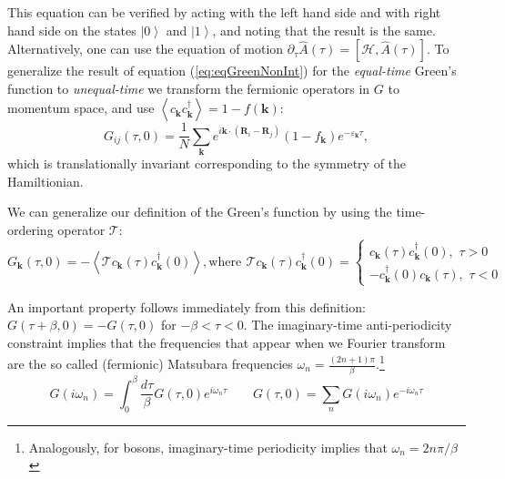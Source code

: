 This equation can be verified by acting with the left hand side and with right hand side on the states $\left| 0 \right\rangle$ and $\left| 1 \right\rangle$, and noting that the result is the same.
Alternatively, one can use the equation of motion $\partial_\tau \hat{A}(\tau) = [ \mathcal{H}, \hat{A} (\tau) ]$.
To generalize the result of equation (\ref{eq:eqGreenNonInt}) for the \emph{equal-time} Green's function to  \emph{unequal-time} we transform the fermionic operators in $G$ to momentum space, and use $\left\langle c_{\bm k} c_{\bm k}^\dagger \right\rangle = 1 - f (\bm k )$:
\begin{equation}
G_{i j}(\tau, 0) = \frac{1}{N} \sum_{\bm k} e^{i \bm k \cdot (\bm R_i - \bm R_j )} ( 1 - f_{\bm k} ) e^{-\varepsilon_{\bm k} \tau } ,
\end{equation}
which is translationally invariant corresponding to the symmetry of the Hamiltionian.

We can generalize our definition of the Green's function by using the time-ordering operator $\mathcal{T}$:
\begin{equation}
G_{\bm k}(\tau, 0) = - \left\langle \mathcal{T} c_{\bm k} ( \tau) c_{\bm k}^\dagger ( 0 ) \right\rangle ,
\text{where} \,\
\mathcal{T} c_{\bm k} ( \tau) c_{\bm k}^\dagger ( 0 ) =
\begin{cases}
c_{\bm k} ( \tau) c_{\bm k}^\dagger ( 0 ), \,\, \tau > 0 \\
- c_{\bm k}^\dagger ( 0 ) c_{\bm k} ( \tau) , \,\, \tau < 0
\end{cases}
\end{equation}

An important property follows immediately from this definition: $G ( \tau + \beta, 0 ) = - G( \tau, 0 )$ for $ -\beta < \tau < 0$.
The imaginary-time anti-periodicity constraint implies that the frequencies that appear when we Fourier transform are the so called (fermionic) Matsubara frequencies $\omega_n = \frac{(2n + 1) \pi}{\beta}$.\footnote{Analogously, for bosons, imaginary-time periodicity implies that $\omega_n = 2n \pi / \beta$}
\begin{equation}
G ( i \omega_n ) = \int_0^\beta \frac{d\tau}{\beta} G( \tau, 0) e^{i\omega_n \tau} \quad\quad G (\tau, 0) = \sum_n G ( i \omega_n ) e^{ - i \omega_n \tau}
\end{equation}

